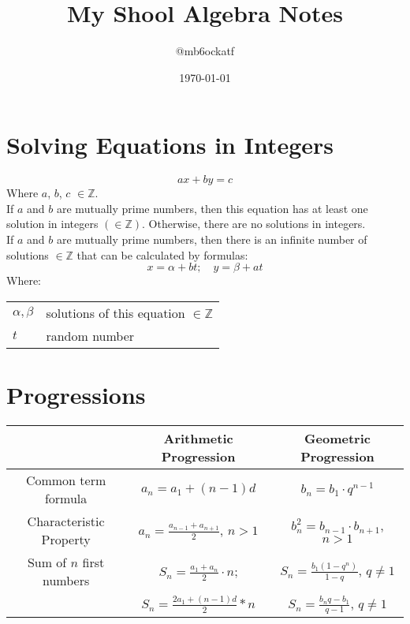 \documentclass[12pt]{article}
\title{My Shool Algebra Notes}
\author{@mb6ockatf}
\date{\today}
\makeatletter
\newenvironment{conditions}
	{\par\vspace{\abovedisplayskip}\noindent\begin{tabular}{>{$}l<{$} @{${}={}$} l}}
	{\end{tabular}\par\vspace{\belowdisplayskip}}
\makeatother
\begin{document}
\maketitle
\tableofcontents

\section{Solving Equations in Integers}
\begin{equation}
	ax + by = c
\end{equation}
Where $a$, $b$, $c$ $\in\mathbb{Z}$.\\
If $a$ and $b$ are mutually prime numbers, then this equation has at least one
solution in integers $(\in\mathbb{Z})$. Otherwise, there are no solutions in
integers.\\
If $a$ and $b$ are mutually prime numbers, then there is an infinite
number of solutions $\in\mathbb{Z}$ that can be calculated by formulas:
\begin{equation}
	x = \alpha + bt; \quad y = \beta + at
\end{equation}
Where:
\begin{conditions}
	\alpha, \beta & solutions of this equation $\in\mathbb{Z}$\\
	t & random number\\
\end{conditions}


\section{Progressions}
\begin{center}
\begin{tabular}{|c|c|c|}
\hline
&Arithmetic Progression & Geometric Progression\\ \hline
Common term formula & $a_n = a_1 + (n - 1)d$ & $b_n = b_1 \cdot q^{n - 1}$\\ \hline
Characteristic Property & $a_n = \frac{a_{n-1}+a_{n+1}}{2}$, $n > 1$ &
	$b_n^2 = b_{n-1} \cdot b_{n+1}$, $n > 1$ \\ \hline
Sum of $n$ first numbers & $S_n = \frac{a_1 + a_n}{2} \cdot n$; &
	$S_n = \frac{b_1(1-q^n)}{1 - q}$, $q \neq 1$\\

& $S_n = \frac{2a_1 + (n - 1)d}{2} * n$ &
	$S_n = \frac{b_n q - b_1}{q - 1}$, $q \neq 1$ \\ \hline
\end{tabular}
\end{center}
\end{document}
